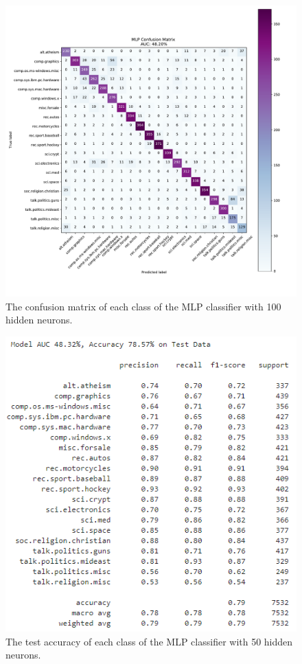 \documentclass[twocolumn]{extarticle}
\begin{document}
\begin{appendices}
\begin{figure}[H]
\centering
\includegraphics[width=0.9\linewidth]{"charts/MLP 100"}
\caption{The confusion matrix of each class of the MLP classifier with 100 hidden neurons.}
\label{chart:mlp-100-conf}
\end{figure}

\begin{figure}[H]
\centering
\includegraphics[width=0.9\linewidth]{charts/mlp-50-acc}
\caption{The test accuracy of each class of the MLP classifier with 50 hidden neurons.}
\label{fig:mlp-50-acc}
\end{figure}


\end{appendices}
\end{document}
